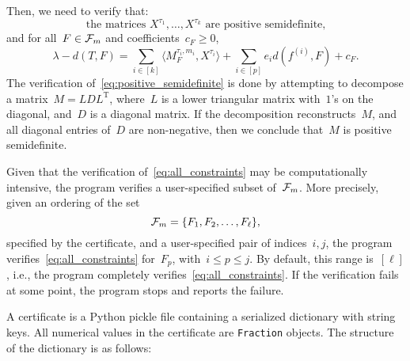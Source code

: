 \documentclass[11pt,a4paper,reqno]{amsart}
\begin{document}
Then, we need to verify that:
\begin{equation}
  \label{eq:positive_semidefinite}
  \text{the matrices } X^{\tau_1}, \dots, X^{\tau_k} \text{ are positive semidefinite,}
\end{equation}
and for all~$F \in {\mathcal F}_m$ and coefficients~$c_F \geq 0$,
\begin{equation}
  \label{eq:all_constraints}
  \lambda - d(T, F) = \sum_{i \in [k]} \langle M_F^{\tau_i, m_i}, X^{\tau_i}\rangle + \sum_{i \in [p]} e_i d(f^{(i)}, F) + c_F.
\end{equation}
The verification of~\eqref{eq:positive_semidefinite} is done by attempting to decompose a
matrix~$M = LDL^{\text{T}}$, where~$L$ is a lower triangular matrix with~$1$'s on the
diagonal, and~$D$ is a diagonal matrix. If the decomposition reconstructs~$M$, and
all diagonal entries of~$D$ are non-negative, then we conclude that~$M$ is positive
semidefinite.

Given that the verification of~\eqref{eq:all_constraints} may be computationally
intensive, the program verifies a user-specified subset of~${\mathcal F}_m$. More precisely,
given an ordering of the set
\begin{equation}
  \label{eq:zero_flags}
  \cF_m = \set{F_1, F_2, \dots, F_\ell},
\end{equation}
specified by the certificate, and a user-specified pair of indices~$i, j$, the
program verifies~\eqref{eq:all_constraints} for~$F_p$, with~$i \leq p \leq j$. By default, this range
is~$[\ell]$, i.e., the program completely verifies~\eqref{eq:all_constraints}. If the
verification fails at some point, the program stops and reports the failure.

A certificate is a Python pickle file containing a serialized dictionary with string
keys. All numerical values in the certificate are \verb|Fraction| objects. The
structure of the dictionary is as follows:
\end{document}
